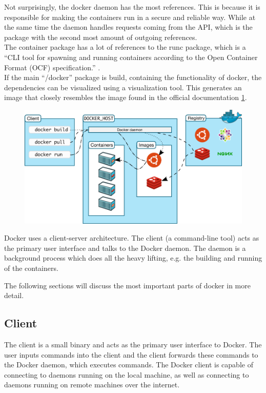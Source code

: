 Not surprisingly, the docker daemon has the most references. This is because it is responsible for making the containers run in a secure and reliable way. While at the same time the daemon handles requests coming from the API, which is the package with the second most amount of outgoing references.\\
The container package has a lot of references to the runc package, which is a ``CLI tool for spawning and running containers according to the Open Container Format (OCF) specification.'' \cite{opencontainersrunc}. \\

If the main ``/docker'' package is build, containing the functionality of docker, the dependencies can be visualized using a visualization tool. This generates an image that closely resembles the image found in the official documentation \ref{fig:dockerarchipic}.

\begin{figure}[H]
\centering
\includegraphics[scale=0.4]{4-softwarearch/images/architecture.png}
\label{fig:dockerarchipic}
\end{figure}
Docker uses a client-server architecture. The client (a command-line tool) acts as the primary user interface and talks to the Docker daemon. The daemon is a background process which does all the heavy lifting, e.g. the building and running of the containers.

The following sections will discuss the most important parts of docker in more detail.

\subsection{Client}
The client is a small binary and acts as the primary user interface to Docker. The user inputs commands into the client and the client forwards these commands to the Docker daemon, which executes commands.
The Docker client is capable of connecting to daemons running on the local machine, as well as connecting to daemons running on remote machines over the internet.

